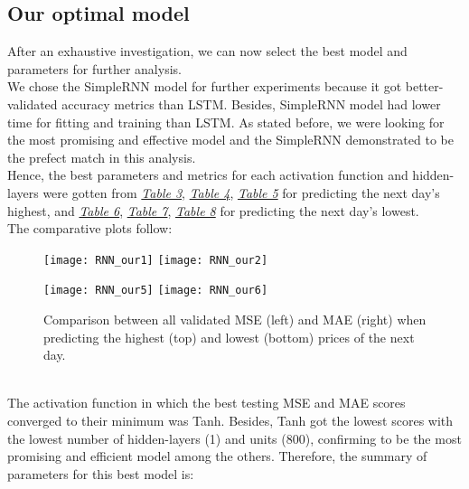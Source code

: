 \subsection{Our optimal model}
\label{chap:Our optimal model}

\quad After an exhaustive investigation, we can now select the best model and parameters for further analysis.\\

We chose the SimpleRNN model for further experiments because it got better-validated accuracy metrics than LSTM. Besides, SimpleRNN model had lower time for fitting and training than LSTM. As stated before, we were looking for the most promising and effective model and the SimpleRNN demonstrated to be the prefect match in this analysis.\\

Hence, the best parameters and metrics for each activation function and hidden-layers were gotten from \hyperref[table:Results for RNN, Sigmoid, High]{\textit{Table 3}}, \hyperref[table:Results for RNN, Tanh, High]{\textit{Table 4}}, \hyperref[table:Results for RNN, ReLu, High]{\textit{Table 5}} for predicting the next day's highest, and \hyperref[table:Results for RNN, Sigmoid, Low]{\textit{Table 6}}, \hyperref[table:Results for RNN, Tanh, Low]{\textit{Table 7}}, \hyperref[table:Results for RNN, ReLu, Low]{\textit{Table 8}} for predicting the next day's lowest.\\

The comparative plots follow:

\begin{figure}[H]
\label{fig:RNN Comparison for highest}
\centering
\texttt{[image: RNN\_our1]}
\texttt{[image: RNN\_our2]}
\end{figure}

\begin{figure}[H]
\label{fig:RNN Comparison for lowest}
\centering
\texttt{[image: RNN\_our5]}
\texttt{[image: RNN\_our6]}
\caption{Comparison between all validated MSE (left) and MAE (right) when predicting the highest (top) and lowest (bottom) prices of the next day.}
\end{figure}\\

The activation function in which the best testing MSE and MAE scores converged to their minimum was Tanh. Besides, Tanh got the lowest scores with the lowest number of hidden-layers (1) and units (800), confirming to be the most promising and efficient model among the others. Therefore, the summary of parameters for this best model is: \\

